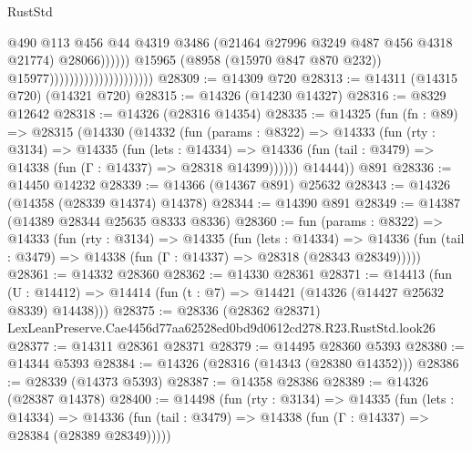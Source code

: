 \begin{lexlean}{RustStd}
\begin{coremodule}
                                                          @490
                                                          @113
                                                          @456
                                                          @44
                                                          @4319
                                                          @3486
                                                          (@21464
                                                            @27996
                                                            @3249
                                                            @487
                                                            @456
                                                            @4318
                                                            @21774)
                                                          @28066))))))
                                              @15965
                                              (@8958 (@15970 @847 @870 @232))
                                              @15977)))))))))))))))))))))
@28309 := @14309 @720
@28313 := @14311 (@14315 @720) (@14321 @720)
@28315 := @14326 (@14230 @14327)
@28316 := @8329 @12642
@28318 := @14326 (@28316 @14354)
@28335 := @14325
    (fun (fn : @89) =>
    @28315
      (@14330
        (@14332
          (fun (params : @8322) =>
          @14333
            (fun (rty : @3134) =>
            @14335
              (fun (lets : @14334) =>
              @14336 (fun (tail : @3479) => @14338 (fun (Γ : @14337) => @28318 @14399))))))
        @14444))
    @891
@28336 := @14450 @14232
@28339 := @14366 (@14367 @891) @25632
@28343 := @14326 (@14358 (@28339 @14374) @14378)
@28344 := @14390 @891
@28349 := @14387 (@14389 @28344 @25635 @8333 @8336)
@28360 := fun (params : @8322) =>
  @14333
    (fun (rty : @3134) =>
    @14335
      (fun (lets : @14334) =>
      @14336 (fun (tail : @3479) => @14338 (fun (Γ : @14337) => @28318 (@28343 @28349)))))
@28361 := @14332 @28360
@28362 := @14330 @28361
@28371 := @14413
    (fun (U : @14412) => @14414 (fun (t : @7) => @14421 (@14326 (@14427 @25632 @8339) @14438)))
@28375 := @28336
    (@28362 @28371)
    LexLeanPreserve.Cae4456d77aa62528ed0bd9d0612cd278.R23.RustStd.look26
@28377 := @14311 @28361 @28371
@28379 := @14495 @28360 @5393
@28380 := @14344 @5393
@28384 := @14326 (@28316 (@14343 (@28380 @14352)))
@28386 := @28339 (@14373 @5393)
@28387 := @14358 @28386
@28389 := @14326 (@28387 @14378)
@28400 := @14498
    (fun (rty : @3134) =>
    @14335
      (fun (lets : @14334) =>
      @14336 (fun (tail : @3479) => @14338 (fun (Γ : @14337) => @28384 (@28389 @28349)))))

\end{coremodule}
\end{lexlean}
